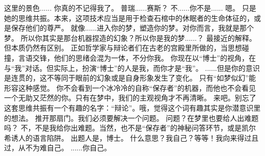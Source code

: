\documentclass[openany]{book}
\begin{document}
\begin{dialogue}
     这里的景色......
     你真的不记得我了。
     普瑞......赛斯？
     不......你不是......
     嗯。
     只是她的思维共振。本来，这项技术应当是用于检查石棺中的休眠者的生命体征的，或是保存他们的尊严。
     就像......进入你的梦，塑造你的梦。对你而言，我就是那个梦。
     所以你其实是那台机器捏造的幻象？所以你是我的梦......？
     最接近的解释。但本质仍然有区别。
     正如哲学家与辩论者们在古老的宫殿里所做的，当思想碰撞，言语交锋，他们的思绪会混为一体，不分你我。
     你现在以“博士”的视角，在与“我”对话。但实际上，扮演“博士”的人是我，而你才是“我”。
     ......但是你的意识是连贯的，这不等同于眼前的幻象或是自身形象发生了变化。
     只有“如梦似幻”能形容这种感觉。
     你不会看到一个冰冷冷的自称“保存者”的机器，而他也不会看见一个无助又茫然的你。只有在梦中，我们的主观视角才不再清晰。
     来吧。别忘了这套思维共振有一个有趣的名字：“辩论”。哦，觉得这个词有趣其实是你潜意识里的想法。
     推开那扇门。我们必须要解决一个问题。
     问题？在梦里也要给人出难题吗？
     不，不是我给你出难题。当然，也不是“保存者”的神秘问答环节，或是凯尔希诱人的语言陷阱。
     出题人是，博士。
     什么意思？我自己？等等！我向来得过且过，从不为难自己。
     ......你自己。
\end{dialogue}
\end{document}

